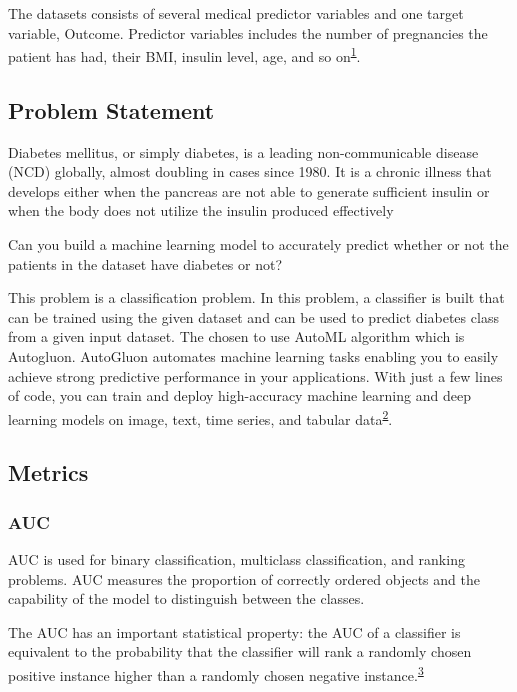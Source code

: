 \documentclass[
]{article}
\begin{document}
The datasets consists of several medical predictor variables and one
target variable, Outcome. Predictor variables includes the number of
pregnancies the patient has had, their BMI, insulin level, age, and so
on\textsuperscript{\protect\hyperlink{ref-ehr}{1}}.

\hypertarget{problem-statement}{%
\subsection{Problem Statement}\label{problem-statement}}

Diabetes mellitus, or simply diabetes, is a leading non-communicable
disease (NCD) globally, almost doubling in cases since 1980. It is a
chronic illness that develops either when the pancreas are not able to
generate sufficient insulin or when the body does not utilize the
insulin produced effectively

Can you build a machine learning model to accurately predict whether or
not the patients in the dataset have diabetes or not?

This problem is a classification problem. In this problem, a classifier
is built that can be trained using the given dataset and can be used to
predict diabetes class from a given input dataset. The chosen to use
AutoML algorithm which is Autogluon. AutoGluon automates machine
learning tasks enabling you to easily achieve strong predictive
performance in your applications. With just a few lines of code, you can
train and deploy high-accuracy machine learning and deep learning models
on image, text, time series, and tabular
data\textsuperscript{\protect\hyperlink{ref-auto}{2}}.

\hypertarget{metrics}{%
\subsection{Metrics}\label{metrics}}

\hypertarget{auc}{%
\subsubsection{AUC}\label{auc}}

AUC is used for binary classification, multiclass classification, and
ranking problems. AUC measures the proportion of correctly ordered
objects and the capability of the model to distinguish between the
classes.

The AUC has an important statistical property: the AUC of a classifier
is equivalent to the probability that the classifier will rank a
randomly chosen positive instance higher than a randomly chosen negative
instance.\textsuperscript{\protect\hyperlink{ref-volo}{3}}
\end{document}
